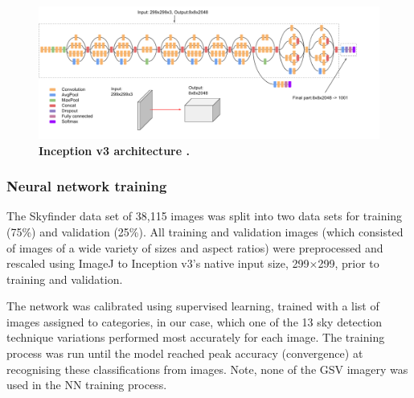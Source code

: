 \documentclass[final,3p,times,authoryear]{elsarticle}
\begin{document}

\begin{figure}
\centering    
\includegraphics[scale=0.33]{inceptionv3onc--oview.png}
\caption{\bf Inception v3 architecture \citep{Google2019}.}    
 \label{fig:incetption3}  
\end{figure} 

\subsubsection{Neural network training}\label{sec:nntraining}    

The Skyfinder data set of 38,115 images was split into two data sets for training (75\%) and validation (25\%). All training and validation images (which consisted of images of a wide variety of sizes and aspect ratios) were preprocessed and rescaled using ImageJ \citep{Rueden2017} to Inception v3's native input size, 299$\times$299, prior to training and validation. 

The network was calibrated using supervised learning, trained with a list of images assigned to categories, in our case, which one of the 13 sky detection technique variations performed most accurately for each image. The training process was run until the model reached peak accuracy (convergence) at recognising these classifications from images. Note, none of the GSV imagery was used in the NN training process.
\end{document}
